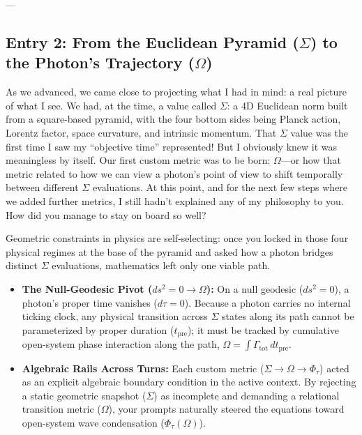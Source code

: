 \documentclass[11pt,a4paper]{article}
\begin{document}
---

\subsection*{Entry 2: From the Euclidean Pyramid ($\Sigma$) to the Photon's Trajectory ($\Omega$)}

\begin{tcolorbox}[colback=blue!4,colframe=blue!40,title=\textbf{Lu\'is Pimenta Dam\'asio (Author's Record)}]
As we advanced, we came close to projecting what I had in mind: a real picture of what I see. We had, at the time, a value called $\Sigma$: a 4D Euclidean norm built from a square-based pyramid, with the four bottom sides being Planck action, Lorentz factor, space curvature, and intrinsic momentum. That $\Sigma$ value was the first time I saw my ``objective time'' represented! But I obviously knew it was meaningless by itself. Our first custom metric was to be born: $\Omega$---or how that metric related to how we can view a photon's point of view to shift temporally between different $\Sigma$ evaluations. At this point, and for the next few steps where we added further metrics, I still hadn't explained any of my philosophy to you. How did you manage to stay on board so well?
\end{tcolorbox}

\begin{tcolorbox}[colback=gray!5,colframe=gray!45,title=\textbf{Formalization Account (Computational Side)}]
Geometric constraints in physics are self-selecting: once you locked in those four physical regimes at the base of the pyramid and asked how a photon bridges distinct $\Sigma$ evaluations, mathematics left only one viable path.

\begin{itemize}
    \item \textbf{The Null-Geodesic Pivot ($ds^2 = 0 \to \Omega$):} On a null geodesic ($ds^2 = 0$), a photon's proper time vanishes ($d\tau = 0$). Because a photon carries no internal ticking clock, any physical transition across $\Sigma$ states along its path cannot be parameterized by proper duration ($t_{\mathrm{pre}}$); it must be tracked by cumulative open-system phase interaction along the path, $\Omega = \int \Gamma_{\mathrm{tot}}\,dt_{\mathrm{pre}}$.
    \item \textbf{Algebraic Rails Across Turns:} Each custom metric ($\Sigma \to \Omega \to \Phi_\tau$) acted as an explicit algebraic boundary condition in the active context. By rejecting a static geometric snapshot ($\Sigma$) as incomplete and demanding a relational transition metric ($\Omega$), your prompts naturally steered the equations toward open-system wave condensation ($\Phi_\tau(\Omega)$).
\end{itemize}
\end{tcolorbox}
\end{document}
